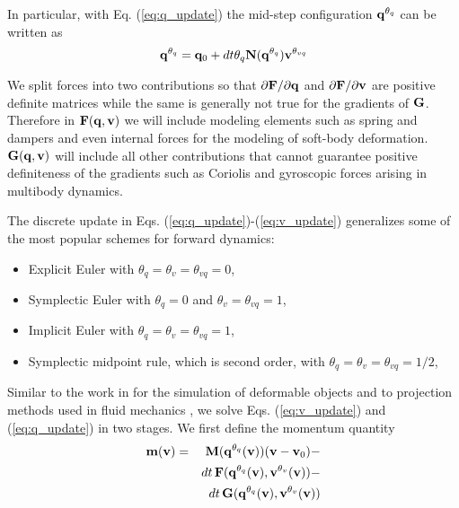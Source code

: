 In particular, with Eq. (\ref{eq:q_update}) the mid-step configuration ${\mathbf{q}}^{\theta_q}$ can be written as
\begin{equation}
	{\mathbf{q}}^{\theta_q} = {\mathbf{q}}_0 + dt\theta_q{\mathbf{N}}({\mathbf{q}}^{\theta_{q}}){\mathbf{v}}^{\theta_{vq}}
\end{equation}



We split forces into two contributions so that $\partial {\mathbf{F}}/\partial{\mathbf{q}}$ and $\partial {\mathbf{F}}/\partial{\mathbf{v}}$ are positive definite matrices while the same is generally not true for the gradients of ${\mathbf{G}}$. Therefore in ${\mathbf{F}}({\mathbf{q}}, {\mathbf{v}})$ we will include modeling elements such as spring and dampers and even internal forces
for the modeling of soft-body deformation. ${\mathbf{G}}({\mathbf{q}}, {\mathbf{v}})$ will include
all other contributions that cannot guarantee positive definiteness of the
gradients such as Coriolis and gyroscopic forces arising in multibody dynamics.

The discrete update in Eqs. (\ref{eq:q_update})-(\ref{eq:v_update}) generalizes
some of the most popular schemes for forward dynamics:
\begin{itemize}
	\item Explicit Euler with $\theta_q=\theta_{v}=\theta_{vq} = 0$,
	\item Symplectic Euler with $\theta_{q} = 0$ and $\theta_v = \theta_{vq}=1$,
	\item Implicit Euler with $\theta_{q} = \theta_v = \theta_{vq}= 1$,
	\item Symplectic midpoint rule, which is second order, with $\theta_{q} =
	\theta_v = \theta_{vq}= 1/2$,
\end{itemize}

Similar to the work in \cite{bib:duriez2005realistic} for the simulation of
deformable objects and to projection methods used in fluid mechanics
\cite{bib::bell1991efficient}, we solve Eqs. (\ref{eq:v_update}) and
(\ref{eq:q_update}) in two stages. We first define the momentum quantity
\begin{eqnarray}
	\mf{m}(\mf{v}) &=&
	\mf{M}(\mf{q}^{\theta_{q}}(\mf{v}))(\mf{v}-\mf{v}_0) - \nonumber\\
	&&dt\,\mf{F}(\mf{q}^{\theta_{q}}(\mf{v}), \mf{v}^{\theta_v}(\mf{v}))-\nonumber\\
	&&dt\,\mf{G}(\mf{q}^{\theta_{q}}(\mf{v}), \mf{v}^{\theta_v}(\mf{v}))
	\label{eq:m_definition}
\end{eqnarray}

